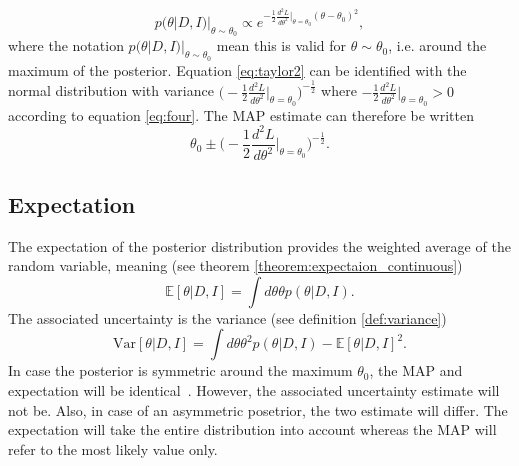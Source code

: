 \begin{equation}
	p(\theta|D,I)|_{\theta \sim \theta_0} \propto e^{-\frac{1}{2}\frac{d^2L}{d\theta^2}\big|_{\theta=\theta_0}(\theta-\theta_0)^2},
	\label{eq:taylor2}
\end{equation}
where the notation $p(\theta|D,I)|_{\theta \sim \theta_0}$ mean this is valid for $\theta\sim \theta_0$, i.e. around the maximum of the posterior. Equation \eqref{eq:taylor2} can be identified with the normal distribution with variance $\big(-\frac{1}{2}\frac{d^2L}{d\theta^2}\big|_{\theta=\theta_0}\big)^{-\frac{1}{2}}$ where $-\frac{1}{2}\frac{d^2L}{d\theta^2}\big|_{\theta=\theta_0}>0$ according to equation \eqref{eq:four}. The MAP estimate can therefore be written
\begin{equation}
	\theta_{0}\pm \bigg(-\frac{1}{2}\frac{d^2L}{d\theta^2}\bigg|_{\theta=\theta_0}\bigg)^{-\frac{1}{2}}.
	\label{eq:thetaa}
\end{equation}

\subsection{Expectation}
\label{sec:expectation_value}
The expectation of the posterior distribution provides the weighted average of the random variable, meaning (see theorem \ref{theorem:expectaion_continuous})
\begin{equation}
	\mathbb{E}[\theta|D,I] = \int d\theta \theta p(\theta|D,I).
	\label{eq:expectationq1}
\end{equation}
The associated uncertainty is the variance (see definition \ref{def:variance})
\begin{equation}
	\text{Var}[\theta|D,I] = \int d\theta \theta^2 p(\theta|D,I)-\mathbb{E}[\theta|D,I]^2.
	\label{eq:eq:varianceq1}
\end{equation}
In case the posterior is symmetric around the maximum $\theta_0$, the MAP and expectation will be identical~\cite{Sivia2006}. However, the associated uncertainty estimate will not be. Also, in case of an asymmetric posetrior, the two estimate will differ. The expectation will take the entire distribution into account whereas the MAP will refer to the most likely value only. 

